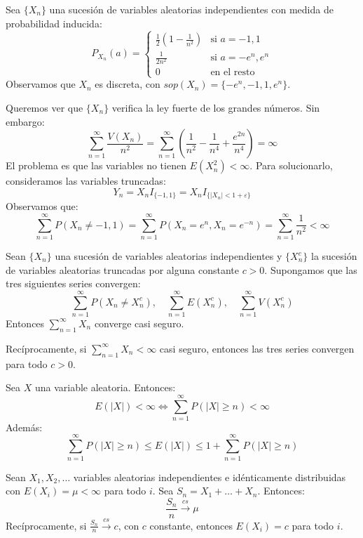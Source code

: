 \begin{example}
    Sea $\{X_n\}$ una sucesión de variables aleatorias independientes con medida de probabilidad inducida:
    $$P_{X_n}(a) = \begin{cases}
            \frac{1}{2}\left(1-\frac{1}{n^2}\right) & \text{si } a = -1, 1     \\
            \frac{1}{2n^2}                          & \text{si } a = -e^n, e^n \\
            0                                       & \text{en el resto}
        \end{cases}$$
    Observamos que $X_n$ es discreta, con $sop(X_n) = \{-e^n, -1, 1, e^n\}$.

    Queremos ver que $\{X_n\}$ verifica la ley fuerte de los grandes números.
    Sin embargo:
    $$\sum_{n=1}^\infty \frac{V(X_n)}{n^2} = \sum_{n=1}^\infty \left(\frac{1}{n^2} - \frac{1}{n^4} + \frac{e^{2n}}{n^4}\right) = \infty$$
    El problema es que las variables no tienen $E(X_n^2) < \infty$.
    Para solucionarlo, consideramos las variables truncadas:
    $$Y_n = X_nI_{\{-1, 1\}} = X_n I_{\{|X_n| < 1 + \varepsilon\}}$$
    Observamos que:
    $$\sum_{n=1}^\infty P(X_n \neq -1, 1) = \sum_{n=1}^\infty P(X_n = e^n, X_n = e^{-n}) = \sum_{n=1}^\infty \frac{1}{n^2} < \infty$$
\end{example}

\begin{theorem}
    Sean $\{X_n\}$ una sucesión de variables aleatorias independientes y $\{X_n^c\}$ la sucesión de variables aleatorias truncadas por alguna constante $c > 0$.
    Supongamos que las tres siguientes series convergen:
    $$\sum_{n=1}^\infty P(X_n \neq X_n^c), \quad \sum_{n=1}^\infty E(X_n^c), \quad \sum_{n=1}^\infty V(X_n^c)$$
    Entonces $\sum_{n=1}^\infty X_n$ converge casi seguro.

    Recíprocamente, si $\sum_{n=1}^\infty X_n < \infty$ casi seguro, entonces las tres series convergen para todo $c > 0$.
\end{theorem}

\begin{lemma}
    Sea $X$ una variable aleatoria.
    Entonces:
    $$E(|X|) < \infty \Leftrightarrow \sum_{n=1}^\infty P(|X| \geq n) < \infty$$
    Además:
    $$\sum_{n=1}^\infty P(|X| \geq n) \leq E(|X|) \leq 1 + \sum_{n=1}^\infty P(|X| \geq n)$$
\end{lemma}

\begin{theorem}
    Sean $X_1, X_2, \dots$ variables aleatorias independientes e idénticamente distribuidas con $E(X_i) = \mu < \infty$ para todo $i$.
    Sea $S_n = X_1 + \dots + X_n$.
    Entonces:
    $$\frac{S_n}{n} \xrightarrow{cs} \mu$$
    Recíprocamente, si $\frac{S_n}{n} \xrightarrow{cs} c$, con $c$ constante, entonces $E(X_i) = c$ para todo $i$.
\end{theorem}

